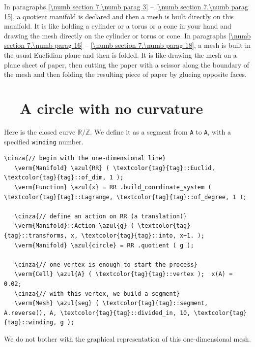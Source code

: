 In paragraphs \ref{\numb section 7.\numb parag 3} -- \ref{\numb section 7.\numb parag 15},
a quotient manifold is declared and then a mesh is built directly on this manifold.
It is like holding a cylinder or a torus or a cone in your hand and drawing the mesh
directly on the cylinder or torus or cone.
In paragraphs \ref{\numb section 7.\numb parag 16} -- \ref{\numb section 7.\numb parag 18},
a mesh is built in the usual Euclidian plane and then is folded.
It is like drawing the mesh on a plane sheet of paper, then cutting the paper with a scissor
along the boundary of the mesh and then folding the resulting piece of paper
by glueing opposite faces.


\section{~~A circle with no curvature}\label{\numb section 7.\numb parag 1}

Here is the closed curve $ \mathbb{R}/{\mathbb Z} $.
We define it as a segment from {\small\tt A} to {\small\tt A}, with a specified
{\small\tt winding} number.

\begin{Verbatim}[commandchars=\\\{\},formatcom=\small\tt,frame=single,
   label=parag-\ref{\numb section 7.\numb parag 1}.cpp,rulecolor=\color{coment},
   baselinestretch=0.94,framesep=2mm                                            ]
   \cinza{// begin with the one-dimensional line}
   \verm{Manifold} \azul{RR} ( \textcolor{tag}{tag}::Euclid, \textcolor{tag}{tag}::of_dim, 1 );
   \verm{Function} \azul{x} = RR .build_coordinate_system ( \textcolor{tag}{tag}::Lagrange, \textcolor{tag}{tag}::of_degree, 1 );

   \cinza{// define an action on RR (a translation)}
   \verm{Manifold}::Action \azul{g} ( \textcolor{tag}{tag}::transforms, x, \textcolor{tag}{tag}::into, x+1. );
   \verm{Manifold} \azul{circle} = RR .quotient ( g );

   \cinza{// one vertex is enough to start the process}
   \verm{Cell} \azul{A} ( \textcolor{tag}{tag}::vertex );  x(A) = 0.02;
   \cinza{// with this vertex, we build a segment}
   \verm{Mesh} \azul{seg} ( \textcolor{tag}{tag}::segment, A.reverse(), A, \textcolor{tag}{tag}::divided_in, 10, \textcolor{tag}{tag}::winding, g );
\end{Verbatim}

We do not bother with the graphical representation of this one-dimensional mesh.

